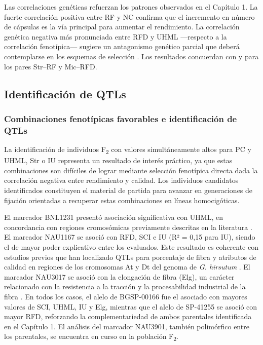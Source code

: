 \documentclass[12pt,oneside]{reedthesis}
\begin{document}
Las correlaciones genéticas refuerzan los patrones observados en el Capítulo 1. La fuerte correlación positiva entre RF y NC confirma que el incremento en número de cápsulas es la vía principal para aumentar el rendimiento. La correlación genética negativa más pronunciada entre RFD y UHML ---respecto a la correlación fenotípica--- sugiere un antagonismo genético parcial que deberá contemplarse en los esquemas de selección \autocite{meredith1984,tang1996}. Los resultados concuerdan con \textcite{mccarty2006} y \textcite{tang1996} para los pares Str--RF y Mic--RFD.

\subsection{Identificación de QTLs}\label{identificaciuxf3n-de-qtls}

\subsubsection{Combinaciones fenotípicas favorables e identificación de QTLs}\label{combinaciones-fenotuxedpicas-favorables-e-identificaciuxf3n-de-qtls}

La identificación de individuos F\textsubscript{2} con valores simultáneamente altos para PC y UHML, Str o IU representa un resultado de interés práctico, ya que estas combinaciones son difíciles de lograr mediante selección fenotípica directa dada la correlación negativa entre rendimiento y calidad. Los individuos candidatos identificados constituyen el material de partida para avanzar en generaciones de fijación orientadas a recuperar estas combinaciones en líneas homocigóticas.

El marcador BNL1231 presentó asociación significativa con UHML, en concordancia con regiones cromosómicas previamente descritas en la literatura \autocite{zhang2005,shen2007}. El marcador NAU1167 se asoció con RFD, SCI e IU (R² = 0,15 para IU), siendo el de mayor poder explicativo entre los evaluados. Este resultado es coherente con estudios previos que han localizado QTLs para porcentaje de fibra y atributos de calidad en regiones de los cromosomas At y Dt del genoma de \emph{G. hirsutum} \autocite{wang2014,xia2014,liu2017}. El marcador NAU3017 se asoció con la elongación de fibra (Elg), un carácter relacionado con la resistencia a la tracción y la procesabilidad industrial de la fibra \autocite{shi2015,liu2018}. En todos los casos, el alelo de BGSP-00166 fue el asociado con mayores valores de SCI, UHML, IU y Elg, mientras que el alelo de SP-41255 se asoció con mayor RFD, reforzando la complementariedad de ambos parentales identificada en el Capítulo 1. El análisis del marcador NAU3901, también polimórfico entre los parentales, se encuentra en curso en la población F\textsubscript{2}.
\end{document}
